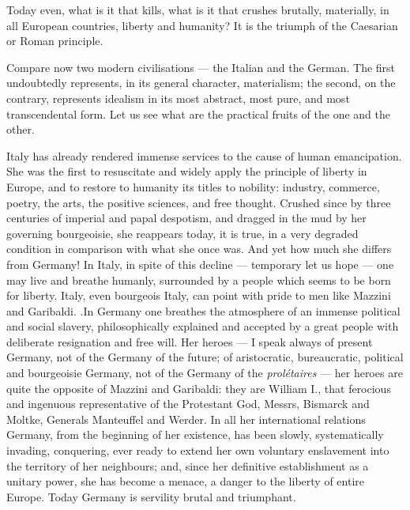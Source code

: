 \documentclass[12pt]{report}
\begin{document}
Today even, what is it that kills, what is it that crushes brutally, materially, in all European countries, liberty and humanity? It is the triumph of the Caesarian or Roman principle.


Compare now two modern civilisations — the Italian and the German. The first undoubtedly represents, in its general character, materialism; the second, on the contrary, represents idealism in its most abstract, most pure, and most transcendental form. Let us see what are the practical fruits of the one and the other.


Italy has already rendered immense services to the cause of human emancipation. She was the first to resuscitate and widely apply the principle of liberty in Europe, and to restore to humanity its titles to nobility: industry, commerce, poetry, the arts, the positive sciences, and free thought. Crushed since by three centuries of imperial and papal despotism, and dragged in the mud by her governing bourgeoisie, she reappears today, it is true, in a very degraded condition in comparison with what she once was. And yet how much she differs from Germany! In Italy, in spite of this decline — temporary let us hope — one may live and breathe humanly, surrounded by a people which seems to be born for liberty. Italy, even bourgeois Italy, can point with pride to men like Mazzini and Garibaldi. .In Germany one breathes the atmosphere of an immense political and social slavery, philosophically explained and accepted by a great people with deliberate resignation and free will. Her heroes — I speak always of present Germany, not of the Germany of the future; of aristocratic, bureaucratic, political and bourgeoisie Germany, not of the Germany of the \emph{prolétaires} — her heroes are quite the opposite of Mazzini and Garibaldi: they are William I., that ferocious and ingenuous representative of the Protestant God, Messrs, Bismarck and Moltke, Generals Manteuffel and Werder. In all her international relations Germany, from the beginning of her existence, has been slowly, systematically invading, conquering, ever ready to extend her own voluntary enslavement into the territory of her neighbours; and, since her definitive establishment as a unitary power, she has become a menace, a danger to the liberty of entire Europe. Today Germany is servility brutal and triumphant.
\end{document}
